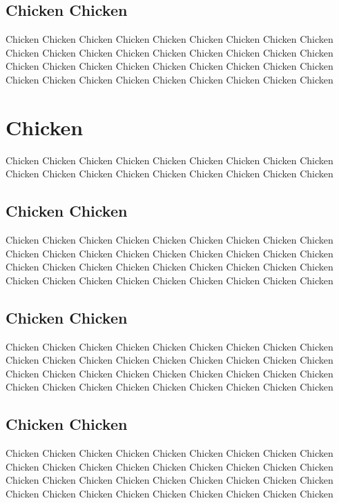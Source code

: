 \documentclass[11pt]{article} %
\begin{document}
\subsection{Chicken Chicken}

Chicken Chicken Chicken Chicken Chicken Chicken Chicken Chicken Chicken Chicken Chicken Chicken Chicken Chicken Chicken Chicken Chicken Chicken Chicken Chicken Chicken Chicken Chicken Chicken Chicken Chicken Chicken Chicken Chicken Chicken Chicken Chicken Chicken Chicken Chicken Chicken

\section{Chicken}

Chicken Chicken Chicken Chicken Chicken Chicken Chicken Chicken Chicken Chicken Chicken Chicken Chicken Chicken Chicken Chicken Chicken Chicken 

\subsection{Chicken Chicken}

Chicken Chicken Chicken Chicken Chicken Chicken Chicken Chicken Chicken Chicken Chicken Chicken Chicken Chicken Chicken Chicken Chicken Chicken Chicken Chicken Chicken Chicken Chicken Chicken Chicken Chicken Chicken Chicken Chicken Chicken Chicken Chicken Chicken Chicken Chicken Chicken 

\subsection{Chicken Chicken}

Chicken Chicken Chicken Chicken Chicken Chicken Chicken Chicken Chicken Chicken Chicken Chicken Chicken Chicken Chicken Chicken Chicken Chicken Chicken Chicken Chicken Chicken Chicken Chicken Chicken Chicken Chicken Chicken Chicken Chicken Chicken Chicken Chicken Chicken Chicken Chicken 

\subsection{Chicken Chicken}

Chicken Chicken Chicken Chicken Chicken Chicken Chicken Chicken Chicken Chicken Chicken Chicken Chicken Chicken Chicken Chicken Chicken Chicken Chicken Chicken Chicken Chicken Chicken Chicken Chicken Chicken Chicken Chicken Chicken Chicken Chicken Chicken Chicken Chicken Chicken Chicken
\end{document}
